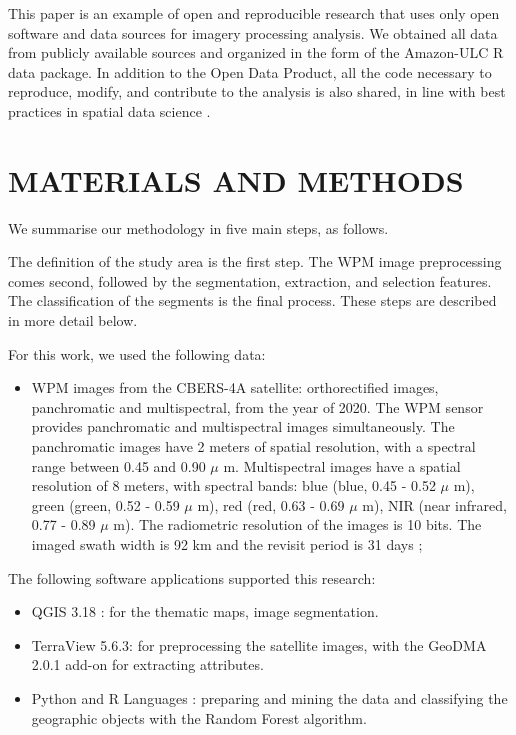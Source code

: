 \documentclass[preprint, 3p,
authoryear]{elsarticle} %
\providecommand{\tightlist}{%
  \setlength{\itemsep}{0pt}\setlength{\parskip}{0pt}}
\begin{document}
This paper is an example of open and reproducible research that uses
only open software and data sources for imagery processing analysis. We
obtained all data from publicly available sources and organized in the
form of the Amazon-ULC R data package. In addition to the Open Data
Product, all the code necessary to reproduce, modify, and contribute to
the analysis is also shared, in line with best practices in spatial data
science \citep{brunsdon2021opening, DESJARDINS2022103091}.

\hypertarget{materials-and-methods}{%
\section{MATERIALS AND METHODS}\label{materials-and-methods}}

We summarise our methodology in five main steps, as follows.

The definition of the study area is the first step. The WPM image
preprocessing comes second, followed by the segmentation, extraction,
and selection features. The classification of the segments is the final
process. These steps are described in more detail below.

For this work, we used the following data:

\begin{itemize}
\tightlist
\item
  WPM images from the CBERS-4A satellite: orthorectified images,
  panchromatic and multispectral, from the year of 2020. The WPM sensor
  provides panchromatic and multispectral images simultaneously. The
  panchromatic images have 2 meters of spatial resolution, with a
  spectral range between 0.45 and 0.90 \(\mu\) m. Multispectral images
  have a spatial resolution of 8 meters, with spectral bands: blue
  (blue, 0.45 - 0.52 \(\mu\) m), green (green, 0.52 - 0.59 \(\mu\) m),
  red (red, 0.63 - 0.69 \(\mu\) m), NIR (near infrared, 0.77 - 0.89
  \(\mu\) m). The radiometric resolution of the images is 10 bits. The
  imaged swath width is 92 km and the revisit period is 31 days
  \citep{INPE2019};
\end{itemize}

The following software applications supported this research:

\begin{itemize}
\item
  QGIS 3.18 \citep{QGISTeam2021}: for the thematic maps, image
  segmentation.
\item
  TerraView 5.6.3: for preprocessing the satellite images, with the
  GeoDMA 2.0.1 add-on \citep{Korting2013} for extracting attributes.
\item
  Python \citep{vanRossum1995} and R Languages \citep{R2022} : preparing
  and mining the data and classifying the geographic objects with the
  Random Forest algorithm.
\end{itemize}
\end{document}
